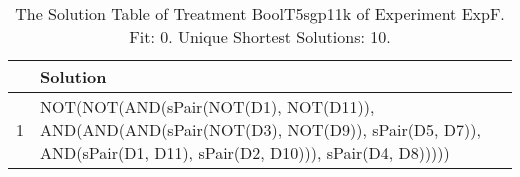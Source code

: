 \begin{table}[ht]
\centering
\begin{tabular}{rp{9cm}}
  \hline
 & Solution \\ 
  \hline
1 & NOT(NOT(AND(sPair(NOT(D1), NOT(D11)), AND(AND(AND(sPair(NOT(D3), NOT(D9)), sPair(D5, D7)), AND(sPair(D1, D11), sPair(D2, D10))), sPair(D4, D8))))) \\ 
   \hline
\end{tabular}
\caption{The Solution Table of Treatment BoolT5sgp11k of Experiment ExpF. Fit: 0. Unique Shortest Solutions: 10.} 
\end{table}
